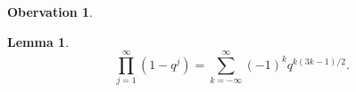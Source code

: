 \documentclass{article}
\newtheorem{lemma}[theorem]{Lemma}
\theoremstyle{definition}
\newtheorem*{observation}{\color{magenta}Obervation}
\begin{document}
\begin{observation}
\begin{center}
\begin{minipage}{.57\textwidth}
\begin{tikzpicture}[x=6mm,y=6mm]
%		
\end{tikzpicture}
\end{minipage}
\end{center}
\end{observation}

\vspace{40pt}


\begin{tcolorbox}[colback=white, colframe=axiomcolor,title={\textbf{Pentagonal Number Theorem}}]
\begin{lemma}
\[
\prod_{j=1}^\infty(1-q^j)=\sum_{k=-\infty}^{\infty}(-1)^k q^{k(3k-1)/2}.
\]
\end{lemma}
\end{tcolorbox}
\end{document}
